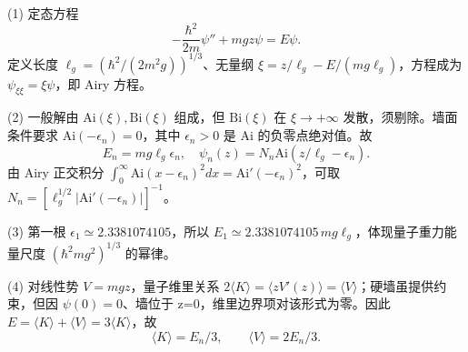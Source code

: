 (1) 定态方程
\[
-\frac{\hbar^2}{2m}\psi''+mgz\psi=E\psi.
\]
定义长度 \(\ell_g=(\hbar^2/(2m^2g))^{1/3}\)、无量纲 \(\xi=z/\ell_g-E/(mg\ell_g)\)，方程成为 \(\psi_{\xi\xi}=\xi\psi\)，即 Airy 方程。

(2) 一般解由 \(\mathrm{Ai}(\xi),\mathrm{Bi}(\xi)\) 组成，但 \(\mathrm{Bi}(\xi)\) 在 \(\xi\to+\infty\) 发散，须剔除。墙面条件要求 \(\mathrm{Ai}(-\epsilon_n)=0\)，其中 \(\epsilon_n>0\) 是 Ai 的负零点绝对值。故
\[
E_n=mg\ell_g\epsilon_n,\quad
\psi_n(z)=N_n\mathrm{Ai}(z/\ell_g-\epsilon_n).
\]
由 Airy 正交积分 \(\int_0^\infty\mathrm{Ai}(x-\epsilon_n)^2dx=\mathrm{Ai}'(-\epsilon_n)^2\)，可取 \(N_n=[\ell_g^{1/2}|\mathrm{Ai}'(-\epsilon_n)|]^{-1}\)。

(3) 第一根 \(\epsilon_1\simeq2.3381074105\)，所以 \(E_1\simeq2.3381074105\,mg\ell_g\)，体现量子重力能量尺度 \((\hbar^2mg^2)^{1/3}\) 的幂律。

(4) 对线性势 \(V=mgz\)，量子维里关系 \(2\langle K\rangle=\langle z V'(z)\rangle=\langle V\rangle\)；硬墙虽提供约束，但因 \(\psi(0)=0\)、墙位于 z=0，维里边界项对该形式为零。因此 \(E=\langle K\rangle+\langle V\rangle=3\langle K\rangle\)，故
\[
\langle K\rangle=E_n/3,\qquad\langle V\rangle=2E_n/3.
\]
